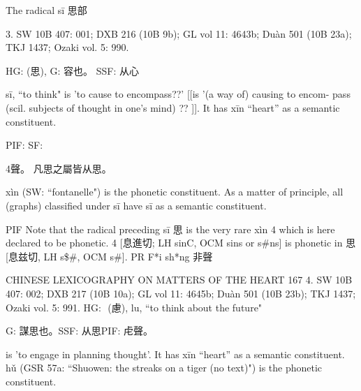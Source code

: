 The radical sī 思部

3. SW 10B 407: 001; DXB 216 (10B 9b); GL vol 11: 4643b; Duàn 501 (10B 23a); TKJ 1437; Ozaki vol. 5: 990.

HG:             (思),
G:	容也。
SSF: 从心

sī, ``to think"
is 'to cause to encompass??' [[is '(a way of) causing to encom- pass (scil. subjects of thought in one's mind) ?? ]].
It has xīn ``heart'' as a semantic constituent.

PIF: SF:

4聲。 凡思之屬皆从思。

xìn (SW: ``fontanelle") is the phonetic constituent.
As a matter of principle, all (graphs) classified under sī have sī
as a semantic constituent.

PIF     Note that the radical preceding sī 思 is the very rare xìn 4 which is here declared to be phonetic.
4 [息進切; LH sinC, OCM sins or s\#ns] is phonetic in 思 [息兹切, LH s\$\#, OCM s\#].
PR	F*i sh*ng 非聲


CHINESE LEXICOGRAPHY ON MATTERS OF THE HEART	167
4. SW 10B 407: 002; DXB 217 (10B 10a); GL vol 11: 4645b; Duàn 501 (10B 23b); TKJ 1437; Ozaki vol. 5: 991.
HG:  (慮), lu, ``to think about the future"

G:	謀思也。SSF:    从思PIF: 虍聲。

is 'to engage in planning thought'.
It has xīn ``heart'' as a semantic constituent.
hǔ (GSR 57a: ``Shuowen: the streaks on a tiger (no text)") is the phonetic constituent.

